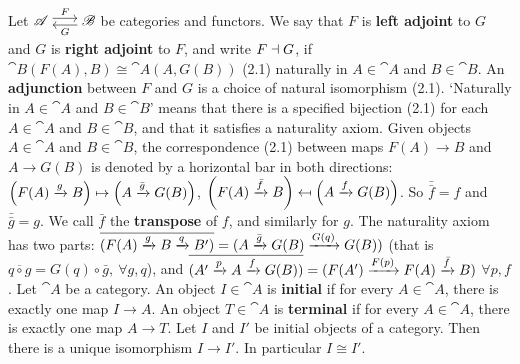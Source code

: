  Let $\cat A \isofuncs{F}{G} \cat B$ be categories and functors. We say that $F$ is \textbf{left adjoint} to $G$ and $G$ is \textbf{right adjoint} to $F$, and write $F \dashv G$, if $\cat B(F(A), B) \cong \cat A(A, G(B))$ (2.1) naturally in $A \in \cat A$ and $B \in \cat B$. An \textbf{adjunction} between $F$ and $G$ is a choice of natural isomorphism (2.1). `Naturally in $A \in \cat A$ and $B \in \cat B$' means that there is a specified bijection (2.1) for each $A \in \cat A$ and $B \in \cat B$, and that it satisfies a naturality axiom. 
 Given objects $A \in \cat A$ and $B \in \cat B$, the correspondence (2.1) between maps $F(A) \to B$ and $A \to G(B)$ is denoted by a horizontal bar in both directions: $\left(F(A) \xrightarrow[]{g} B\right) \mapsto \left(A \xrightarrow[]{\bar{g}} G(B)\right)$, $\left(F(A) \xrightarrow[]{\bar{f}} B\right) \mapsfrom \left(A \xrightarrow[]{f} G(B)\right)$. So $\bar{\bar{f}} = f$ and $\bar{\bar{g}} = g$. We call $\bar{f}$ the \textbf{transpose} of $f$, and similarly for $g$. 
 The naturality axiom has two parts: $\overline{(F(A) \xrightarrow[]{g} B \xrightarrow[]{q} B')} = (A \xrightarrow[]{\bar{g}} G(B) \xrightarrow[]{G(q)} G(B))$ (that is $\overline{q \circ g} = G(q) \circ \bar{g},\ \forall g,q$), and $\overline{(A' \xrightarrow[]{p} A \xrightarrow[]{f} G(B))} = (F(A') \xrightarrow[]{F(p)} F(A) \xrightarrow[]{\bar{f}} B)$ $\forall p,f$.
 Let $\cat A$ be a category. An object $I \in \cat A$ is \textbf{initial} if for every $A \in \cat A$, there is exactly one map $I \to A$. An object $T \in \cat A$ is \textbf{terminal} if for every $A \in \cat A$, there is exactly one map $A \to T$.
 Let $I$ and $I'$ be initial objects of a category. Then there is a unique isomorphism $I \to I'$. In particular $I \cong I'$.